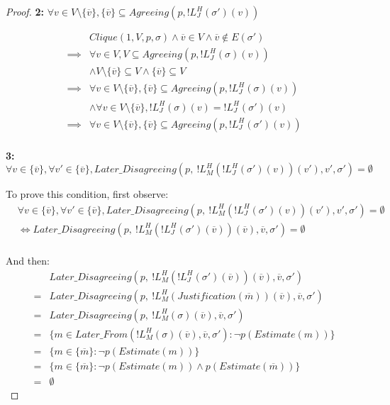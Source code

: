 \begin{proof}
\textbf{2:} $\forall v \in V \setminus \{\overline{v}\}, \{\overline{v}\} \subseteq Agreeing(p, !L^H_J(\sigma')(v))$

\begin{align}
          &Clique(1, V, p, \sigma) \land \overline{v} \in V \land \overline{v} \notin E(\sigma') \\
  \implies&\forall v \in V, V \subseteq Agreeing(p, !L^H_J(\sigma)(v)) \\
          &\land V \setminus \{\overline{v}\} \subseteq V \land \{\overline{v}\} \subseteq V \\
  \implies&\forall v \in V \setminus \{\overline{v}\}, \{\overline{v}\} \subseteq Agreeing(p, !L^H_J(\sigma)(v)) \\
          &\land \forall v \in V \setminus \{\overline{v}\}, !L^H_J(\sigma)(v) = !L^H_J(\sigma')(v) \\
  \implies&\forall v \in V \setminus \{\overline{v}\}, \{\overline{v}\} \subseteq Agreeing(p, !L^H_J(\sigma')(v)) \\
\end{align}

\textbf{3:} $\forall v \in \{\overline{v}\}, \forall v' \in \{\overline{v}\}, Later\_Disagreeing(p,~!L^H_M(!L^H_J(\sigma')(v))(v'), v', \sigma') = \emptyset$


To prove this condition, first observe:
\begin{align}
&\forall v \in \{\overline{v}\}, \forall v' \in \{\overline{v}\}, Later\_Disagreeing(p,~!L^H_M(!L^H_J(\sigma')(v))(v'), v', \sigma') = \emptyset \\
&\iff Later\_Disagreeing(p,~!L^H_M(!L^H_J(\sigma')(\overline{v}))(\overline{v}), \overline{v}, \sigma') = \emptyset \\
\end{align}

And then:
\begin{align}
 &Later\_Disagreeing(p,~!L^H_M(!L^H_J(\sigma')(\overline{v}))(\overline{v}), \overline{v}, \sigma') \\
=&Later\_Disagreeing(p,~!L^H_M(Justification(\overline{m}))(\overline{v}), \overline{v}, \sigma') \\
=& Later\_Disagreeing(p,~!L^H_M(\sigma)(\overline{v}), \overline{v}, \sigma') \\
=& \{ m \in Later\_From(!L^H_M(\sigma)(\overline{v}), \overline{v}, \sigma') : \neg p(Estimate(m)) \}\\
=& \{ m \in \{\overline{m}\} : \neg p(Estimate(m)) \}\\
=& \{ m \in \{\overline{m}\} : \neg p(Estimate(m)) \land p(Estimate(\overline{m})) \} \\
=& \emptyset
\end{align}


\end{proof}
